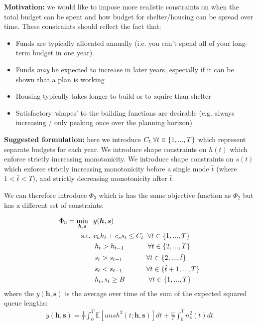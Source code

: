 \documentclass{article}
\begin{document}
\textbf{Motivation:} we would like to impose more realistic constraints on when the total budget can be spent and how budget for shelter/housing can be spread over time. These constraints should reflect the fact that:
%
\begin{itemize}[noitemsep]
\item Funds are typically allocated annually (i.e. you can't spend all of your long-term budget in one year)
\item Funds \emph{may} be expected to increase in later years, especially if it can be shown that a plan is working
\item Housing typically takes longer to build or to aquire than shelter
  \item Satisfactory `shapes' to the building functions are desirable (e.g. always increasing / only peaking once over the planning horizon)
\end{itemize}
%
\textbf{Suggested formulation:} here we introduce $C_t \hspace{0.1cm} \forall t \in \{1, ..., T\}$ which represent separate budgets for each year. We introduce shape constraints on $h(t)$ which enforce strictly increasing monotonicity. We introduce shape constraints on $s(t)$ which enforce strictly increasing monotonicity before a single mode $\hat{t}$ (where $1 < \hat{t} < T$), and strictly decreasing monotonicity after $\hat{t}$. \par
%
We can therefore introduce $\Phi_3$ which is has the same objective function as $\Phi_2$ but has a different set of constraints: 

\begin{align*}
        & \Phi_3 = \min_{\boldsymbol{h},\boldsymbol{s}} \hspace{0.2cm} y(\boldsymbol{h},\boldsymbol{s}) \\
        & \hspace{1cm} \text{ s.t. } c_{h}h_{t} + c_{s}s_{t} \leq C_t \hspace{0.2cm} \forall t \in \{1, ..., T\} \\
        & \hspace{1.8cm} h_t > h_{t-1} \hspace{1.2cm} \forall t \in \{2, ..., T\} \\
        & \hspace{1.8cm} s_t > s_{t-1} \hspace{1.2cm} \forall t \in \{2, ..., \hat{t}\} \\
        & \hspace{1.8cm} s_t < s_{t-1} \hspace{1.2cm} \forall t \in \{\hat{t}+1, ..., T\} \\
        & \hspace{1.8cm} h_t, s_t \geq B \hspace{1.2cm} \forall t \in \{1, ..., T\}
\end{align*}
%
where the $y(\boldsymbol{h},\boldsymbol{s})$ is the average over time of the sum of the expected squared queue lengths: 
\begin{align*}
  y(\boldsymbol{h},\boldsymbol{s}) = \frac{1}{T} \int_0^T \mathbb{E}[unsh^2(t; \boldsymbol{h},\boldsymbol{s})] dt + \frac{w}{T} \int_0^T n_{\boldsymbol{s}}^2(t) dt
\end{align*}
\end{document}
